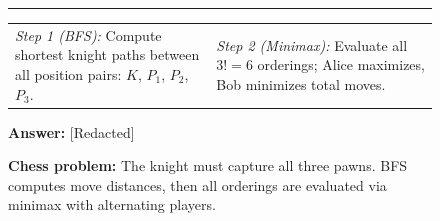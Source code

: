 \documentclass{article}
\begin{document}
\begin{figure}[t]
\begin{tcolorbox}
\begin{minipage}{0.65\textwidth}
    \end{minipage}

    \vspace{0.15cm}
    \hrule
    \vspace{0.15cm}

    \begin{tabular}{@{}p{}p{}@{}}
    \textit{Step 1 (BFS):} Compute shortest knight paths between all position pairs: $K$, $P_1$, $P_2$, $P_3$. &
    \textit{Step 2 (Minimax):} Evaluate all $3! = 6$ orderings; Alice maximizes, Bob minimizes total moves. \\
    \end{tabular}

    \vspace{0.15cm}
    \hfill \textbf{Answer:} [Redacted]
    \end{tcolorbox}

    \caption{\textbf{Chess problem:} The knight must capture all three pawns. \colorbox{orange!12}{BFS} computes move distances, then \colorbox{orange!30}{all orderings} are evaluated via \colorbox{orange!50}{minimax} with alternating players.}
\end{figure}
\end{document}
